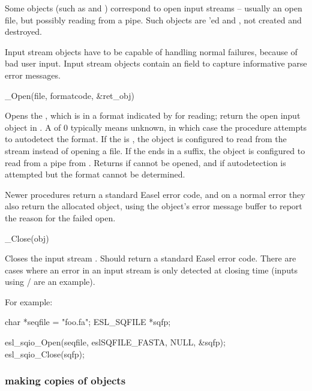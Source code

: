 Some objects (such as  and )
correspond to open input streams -- usually an open file, but possibly
reading from a pipe. Such objects are 'ed and
, not created and destroyed.

Input stream objects have to be capable of handling normal failures,
because of bad user input. Input stream objects contain an
 field to capture informative parse error
messages. 

\begin{sreapi}
\hypertarget{ifc:Open} 
{\item[\_Open(file, formatcode, \&ret\_obj)]}

Opens the , which is in a format indicated by
 for reading; return the open input object in
. A  of 0 typically means unknown,
in which case the  procedure attempts to autodetect
the format. If the  is , the object is
configured to read from the  stream instead of opening a
file. If the  ends in a  suffix, the object is
configured to read from a pipe from . Returns
 if  cannot be opened, and
 if autodetection is attempted but the format cannot
be determined. 

Newer  procedures return a standard Easel error code,
and on a normal error they also return the allocated object, using the
object's error message buffer to report the reason for the failed
open.

\hypertarget{ifc:Close} 
{\item[\_Close(obj)]}

Closes the input stream . Should return a standard Easel
error code. There are cases where an error in an input stream is only
detected at closing time (inputs using /
  are an example).
\end{sreapi}

For example:
\begin{cchunk}
    char        *seqfile = "foo.fa";
    ESL_SQFILE  *sqfp;

    esl_sqio_Open(seqfile, eslSQFILE_FASTA, NULL, &sqfp);
    esl_sqio_Close(sqfp);
\end{cchunk}


  \subsubsection{making copies of objects}

